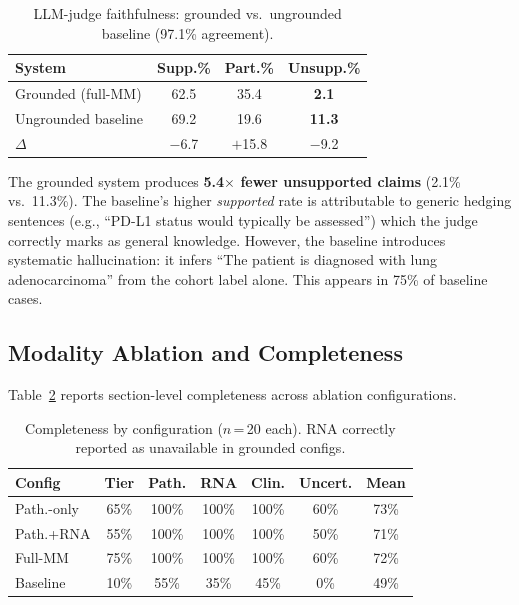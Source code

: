 \documentclass[11pt,twocolumn]{article}
\begin{document}
\begin{table}[h]
\centering
\small
\begin{tabular}{lccc}
\toprule
\textbf{System} & \textbf{Supp.\%} & \textbf{Part.\%} & \textbf{Unsupp.\%} \\
\midrule
Grounded (full-MM) & 62.5 & 35.4 & \textbf{2.1} \\
Ungrounded baseline & 69.2 & 19.6 & \textbf{11.3} \\
\midrule
$\Delta$ & $-$6.7 & $+$15.8 & $-$9.2 \\
\bottomrule
\end{tabular}
\caption{LLM-judge faithfulness: grounded vs.\ ungrounded baseline
  (97.1\% agreement).}
\label{tab:faithfulness}
\end{table}

The grounded system produces \textbf{5.4$\times$ fewer unsupported
claims} (2.1\% vs.\ 11.3\%). The baseline's higher \emph{supported}
rate is attributable to generic hedging sentences (e.g., ``PD-L1
status would typically be assessed'') which the judge correctly marks as
general knowledge. However, the
baseline introduces systematic hallucination: it infers ``The patient is diagnosed with lung adenocarcinoma'' from the cohort
label alone. This appears in 75\% of baseline cases.

\subsection{Modality Ablation and Completeness}

Table~\ref{tab:ablation} reports section-level completeness across
ablation configurations.

\begin{table}[h]
\centering
\small
\setlength{\tabcolsep}{4pt}
\begin{tabular}{lcccccc}
\toprule
\textbf{Config} & \textbf{Tier} & \textbf{Path.} & \textbf{RNA} & \textbf{Clin.} & \textbf{Uncert.} & \textbf{Mean} \\
\midrule
Path.-only    & 65\% & 100\% & 100\% & 100\% & 60\% & 73\% \\
Path.+RNA     & 55\% & 100\% & 100\% & 100\% & 50\% & 71\% \\
Full-MM       & 75\% & 100\% & 100\% & 100\% & 60\% & 72\% \\
\midrule
Baseline      & 10\% & 55\%  & 35\%  & 45\%  & 0\%  & 49\% \\
\bottomrule
\end{tabular}
\caption{Completeness by configuration ($n$\,=\,20 each).
  RNA correctly reported as unavailable in grounded configs.}
\label{tab:ablation}
\end{table}
\end{document}
